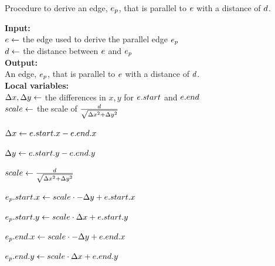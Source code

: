 


\begin{algorithm}[tb!]
    \caption{Procedure to derive an edge, $ \EdgeParallel $, that is parallel to $ e $ with a distance of $ d $.}\label{alg:derive corridor edge}

    \textbf{Input:} \\
    $ e \gets $ the edge used to derive the parallel edge $ \EdgeParallel $ \\
    $ d \gets $ the distance between $ e $ and $ \EdgeParallel $ \\

    \textbf{Output:} \\
    An edge, $ \EdgeParallel $, that is parallel to $ e $ with a distance of $ d $. \\

    \textbf{Local variables:} \\
    $ \Delta x, \Delta y \gets $ the differences in $ x, y $ for $ e.start $ and $ e.end $ \\
    $ scale \gets $ the scale of $ \frac{d}{\sqrt{\Delta x^2 + \Delta y^2}} $ \\

    \begin{algorithmic}[1]
            \State $ \Delta x \gets e.start.x - e.end.x $

            \State $ \Delta y \gets e.start.y - e.end.y $

            \State $ scale \gets \frac{d}{\sqrt{\Delta x^2 + \Delta y^2}} $

            \State $ e_p.start.x \gets scale \cdot -\Delta y + e.start.x $

            \State $ e_p.start.y \gets scale \cdot \Delta x + e.start.y $

            \State $ e_p.end.x \gets scale \cdot -\Delta y + e.end.x $

            \State $ e_p.end.y \gets scale \cdot \Delta x + e.end.y $

        \State \Return{$ \EdgeParallel $}

        \EndProcedure

    \end{algorithmic}
\end{algorithm}

